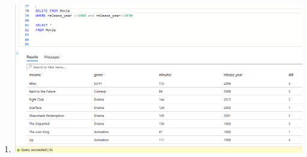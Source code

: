 \documentclass[11pt]{article}
\begin{document}
\begin{enumerate}
\item \includegraphics[width = \textwidth]{delete.png}
\end{enumerate}
\end{document}
